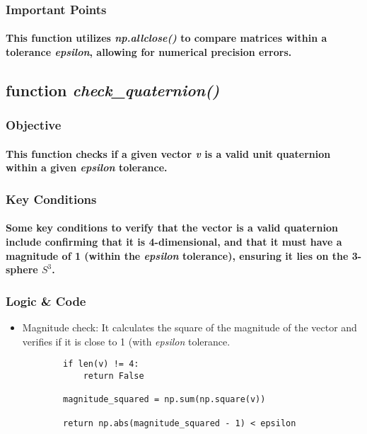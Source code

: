 \documentclass[12pt, letterpaper]{article}
\begin{document}
\subsubsection{Important Points}
\paragraph{This function utilizes \textit{np.allclose()} to compare matrices within a tolerance \textit{epsilon}, allowing for numerical precision errors.}
\subsection{function \textit{check\_quaternion()}}
\subsubsection{Objective}
\paragraph{This function checks if a given vector \textit{v} is a valid unit quaternion within a given \textit{epsilon} tolerance.}
\subsubsection{Key Conditions}
\paragraph{Some key conditions to verify that the vector is a valid quaternion include confirming that it is 4-dimensional, and that it must have a magnitude of 1 (within the \textit{epsilon} tolerance), ensuring it lies on the 3-sphere $S^3$.}
\subsubsection{Logic \& Code}
\begin{itemize}
    \item{Magnitude check: It calculates the square of the magnitude of the vector and verifies if it is close to 1 (with \textit{epsilon} tolerance.}
    \begin{verbatim}
        if len(v) != 4:
            return False
    
        magnitude_squared = np.sum(np.square(v))
    
        return np.abs(magnitude_squared - 1) < epsilon
    \end{verbatim}
\end{itemize}
\end{document}
